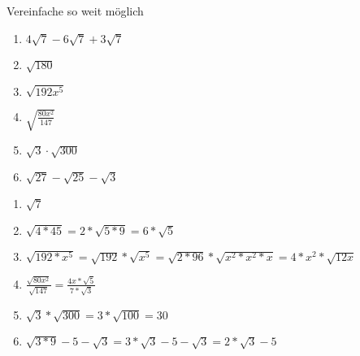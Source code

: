 









 Vereinfache so weit möglich
\begin{multicols}{3}
  \begin{enumerate}
    \item $4\sqrt{7}-6\sqrt{7} + 3\sqrt{7}$
    \item $\sqrt{180}$
    \item $\sqrt{192x^5}$
    \item $\sqrt{\frac{80x^2}{147}}$
    \item $\sqrt{3}\cdot\sqrt{300}$
    \item $\sqrt{27}-\sqrt{25}-\sqrt{3}$
  \end{enumerate}
\end{multicols}

\begin{lsg}{}
  \begin{multicols}{3}
    \begin{enumerate}
      \item $\sqrt{7}$
      \item $\sqrt{4*45}=2*\sqrt{5*9}=6*\sqrt 5$
      \item $\sqrt{192*x^5}=\sqrt{192}*\sqrt{x^5}=\sqrt{2*96}*\sqrt{x^2*x^2*x}=4*x^2*\sqrt{12x}$
      \item $\frac{\sqrt{80x^2}}{\sqrt{147}} = \frac{4x*\sqrt{5}}{7*\sqrt{3}}$
      \item $\sqrt{3}*\sqrt{300}=3*\sqrt{100}=30$
      \item $\sqrt{3*9}-5-\sqrt{3}=3*\sqrt{3}-5-\sqrt{3}=2*\sqrt{3}-5$
    \end{enumerate}
  \end{multicols}
\end{lsg}



